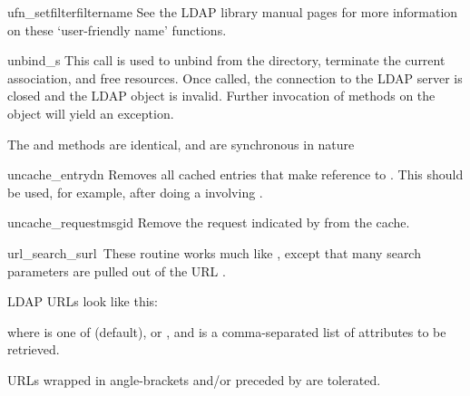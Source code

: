
\begin{funcdesc}{ufn_setfilter}{filtername}
See the LDAP library manual pages for more information on these
`user-friendly name' functions.
\end{funcdesc}


\begin{funcdesc}{unbind_s}{}
This call is used to unbind from the directory, terminate the current
association, and free resources. Once called, the connection to the
LDAP server is closed and the LDAP object is invalid. Further invocation
of methods on the object will yield an exception.

The  and  methods are identical, and are 
synchronous in nature
\end{funcdesc}


\begin{funcdesc}{uncache_entry}{dn}
Removes all cached entries that make reference to . This should be
used, for example, after doing a  involving .
\end{funcdesc}


\begin{funcdesc}{uncache_request}{msgid}
Remove the request indicated by  from the cache.
\end{funcdesc}


\begin{funcdesc}{url_search_s}{url\, }
These routine works much like , except that many search
parameters are pulled out of the URL . 

LDAP URLs look like this: 


where  is one of  (default),  or ,
and  is a comma-separated list of attributes to be retrieved.

URLs wrapped in angle-brackets and/or preceded by  are 
tolerated.
\end{funcdesc}

